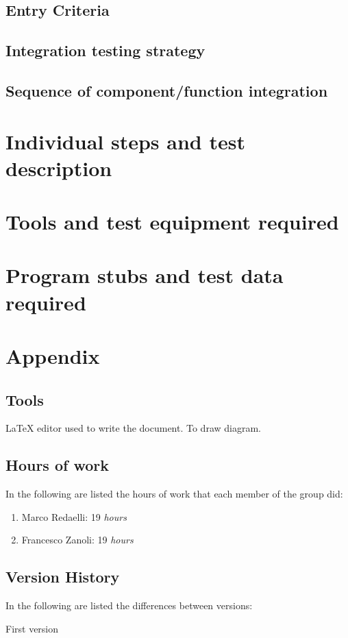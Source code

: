\documentclass{../Common/Structure/doc_pdf}
\begin{document}
\section{Entry Criteria}

\section{Integration testing strategy}

\section{Sequence of component/function integration}


\chapter{Individual steps and test description}


\chapter{Tools and test equipment required}


\chapter{Program stubs and test data required}


\appendix
\chapter{Appendix}

\section{Tools}
\begin{itemize}
	 \LaTeX{} editor used to write the document.
	 To draw diagram.\end{itemize}
\section{Hours of work}
In the following are listed the hours of work that each member of the group did:
\begin{enumerate}
	\item Marco Redaelli: 19 \emph{hours}
	\item Francesco Zanoli: 19 \emph{hours}
\end{enumerate}
\section{Version History}
In the following are listed the differences between versions:
\begin{enumerate}
	 First version
\end{enumerate}
\end{document}
